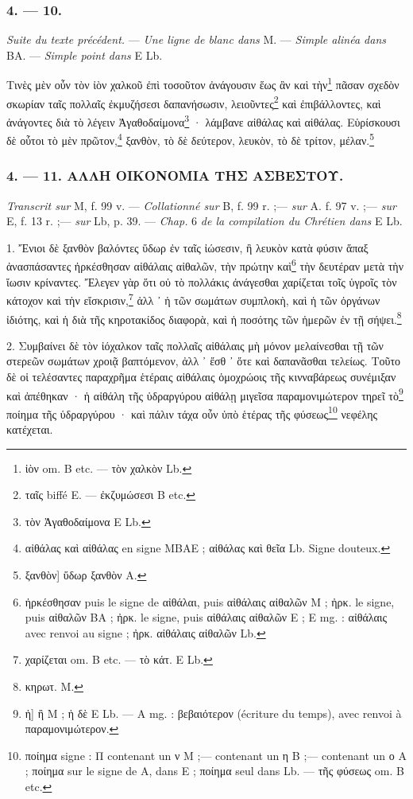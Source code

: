 \documentclass[a4paper, 11pt, oneside, polutonikogreek, french]{article}
\begin{document}
\subsubsection{4. --- 10.}

\emph{Suite du texte précédent.} --- \emph{Une ligne de blanc dans} M. --- \emph{Simple alinéa dans} BA. --- \emph{Simple point dans} E Lb.

Τινὲς μὲν οὖν τὸν ἰὸν χαλκοῦ ἐπὶ τοσοῦτον ἀνάγουσιν ἕως ἂν καὶ τὴν\footnote{ἰὸν om. B etc. --- τὸν χαλκὸν Lb.} πᾶσαν σχεδὸν σκωρίαν ταῖς πολλαῖς ἐκμυζήσεσι δαπανήσωσιν, λειοῦντες\footnote{ταῖς biffé E. --- ἐκζυμώσεσι B etc.} καὶ ἐπιβάλλοντες, καὶ ἀνάγοντες διὰ τὸ λέγειν Ἀγαθοδαίμονα\footnote{τὸν Ἀγαθοδαίμονα E Lb.} · λάμβανε αἰθάλας καὶ αἰθάλας. Εὑρίσκουσι δὲ οὗτοι τὸ μὲν πρῶτον,\footnote{αἰθάλας καὶ αἰθάλας en signe MBAE ; αἰθάλας καὶ θεῖα Lb. Signe douteux.} ξανθὸν, τὸ δὲ δεύτερον, λευκὸν, τὸ δὲ τρίτον, μέλαν.\footnote{ξανθὸν] ὕδωρ ξανθὸν A.}

\bigskip
\centerline{\EightStarTaper}
\centerline{\EightStarTaper\EightStarTaper}
\bigskip

\subsubsection{4. --- 11. ΑΛΛΗ ΟΙΚΟΝΟΜΙΑ ΤΗΣ ΑΣΒΕΣΤΟΥ.}

\emph{Transcrit sur} M, f. 99 v. --- \emph{Collationné sur} B, f. 99 r. ;--- \emph{sur} A. f. 97 v. ;--- \emph{sur} E, f. 13 r. ;--- \emph{sur} Lb, p. 39. --- \emph{Chap.} 6 \emph{de la compilation du Chrétien dans} E Lb.

1. Ἔνιοι δὲ ξανθὸν βαλόντες ὕδωρ ἐν ταῖς ἰώσεσιν, ἢ λευκὸν κατὰ φύσιν ἅπαξ ἀνασπάσαντες ἠρκέσθησαν αἰθάλαις αἰθαλῶν, τὴν πρώτην καὶ\footnote{ἠρκέσθησαν puis le signe de αἰθάλαι, puis αἰθάλαις αἰθαλῶν M ; ἠρκ. le signe, puis αἰθαλῶν BA ; ἠρκ. le signe, puis αἰθάλαις αἰθαλῶν E ; E mg. : αἰθάλαις avec renvoi au signe ; ἠρκ. αἰθάλαις αἰθαλῶν Lb.} τὴν δευτέραν μετὰ τὴν ἴωσιν κρίναντες. Ἔλεγεν γὰρ ὅτι οὐ τὸ πολλάκις ἀνάγεσθαι χαρίζεται τοῖς ὑγροῖς τὸν κάτοχον καὶ τὴν εἴσκρισιν,\footnote{χαρίζεται om. B etc. --- τὸ κάτ. E Lb.} ἀλλ ᾽ ἡ τῶν σωμάτων συμπλοκὴ, καὶ ἡ τῶν ὀργάνων ἰδιότης, καὶ ἡ διὰ τῆς κηροτακίδος διαφορὰ, καὶ ἡ ποσότης τῶν ἡμερῶν ἐν τῇ σήψει.\footnote{κηρωτ. M.}

2. Συμβαίνει δὲ τὸν ἰόχαλκον ταῖς πολλαῖς αἰθάλαις μὴ μόνον μελαίνεσθαι τῇ τῶν στερεῶν σωμάτων χροιᾷ βαπτόμενον, ἀλλ ᾽ ἔσθ ᾽ ὅτε καὶ δαπανᾶσθαι τελείως. Τοῦτο δὲ οἱ τελέσαντες παραχρῆμα ἑτέραις αἰθάλαις ὁμοχρώοις τῆς κινναβάρεως συνέμιξαν καὶ ἀπέθηκαν · ἡ αἰθάλη τῆς ὑδραργύρου αἰθάλῃ μιγεῖσα παραμονιμώτερον τηρεῖ τὸ\footnote{ἡ] ἢ M ; ἡ δὲ E Lb. --- A mg. : βεβαιότερον (écriture du temps), avec renvoi à παραμονιμώτερον.} ποίημα τῆς ὑδραργύρου · καὶ πάλιν τάχα οὖν ὑπὸ ἑτέρας τῆς φύσεως\footnote{ποίημα signe : Π contenant un ν M ;--- contenant un η B ;--- contenant un ο A ; ποίημα sur le signe de A, dans E ; ποίημα seul dans Lb. --- τῆς φύσεως om. B etc.} νεφέλης κατέχεται.
\end{document}
